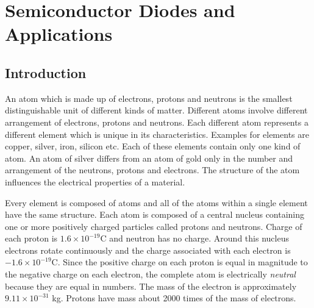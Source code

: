 \makeatletter
\def\@makechapterhead#1{%
  \vspace*{10\p@}%
  {\parindent \z@ \raggedleft \normalfont
    \ifnum \c@secnumdepth >\m@ne
      \if@mainmatter
        \LARGE\bfseries \@chapapp\space \thechapter
	\vskip 4pt
        \hrule height 2pt
        \par\nobreak
        \vskip 5\p@
      \fi
    \fi
    \interlinepenalty\@M
    \huge \bfseries #1\par\nobreak
\vskip 5pt

\hrule height 2pt   
 \vskip 10\p@  
  }}
\makeatother

\chapter{Semiconductor Diodes and Applications}\label{chap1}

\medskip
\section{Introduction}\label{sec1.1}

An atom which is made up of electrons, protons and neutrons is the smallest distinguishable unit of different kinds of matter. Different atoms involve different arrangement of electrons, protons and neutrons. Each different atom represents a different element which is unique in its characteristics. Examples for elements are copper, silver, iron, silicon etc. Each of these elements contain only one kind of atom. An atom of silver differs from an atom of gold only in the number and arrangement of the neutrons, protons and electrons. The structure of the atom influences the electrical properties of a material.

Every element is composed of atoms and all of the atoms within a single element have the same structure. Each atom is composed of a central nucleus containing one or more positively charged particles called protons and neutrons. Charge of each proton is $1.6\times 10^{-19}$C and neutron has no charge. Around this nucleus electrons rotate continuously and the charge associated with each electron is $-1.6\times 10^{-19}$C. Since the positive charge on each proton is equal in magnitude to the negative charge on each electron, the complete atom is electrically {\em neutral} because they are equal in numbers. The mass of the electron is approximately $9.11\times 10^{-31}$ kg. Protons have mass about 2000 times of the mass of electrons.

